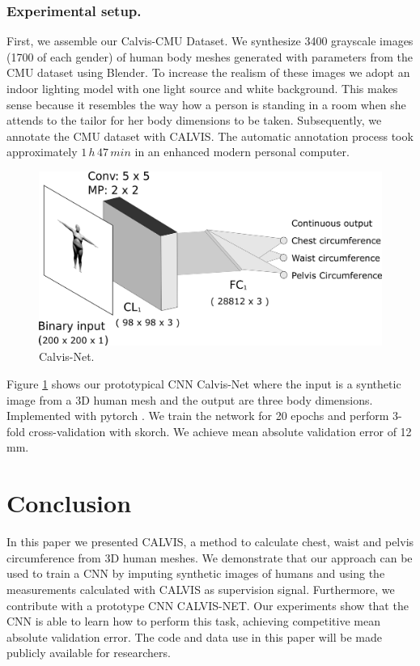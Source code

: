\documentclass[runningheads, orivec]{llncs}
\begin{document}
\subsubsection{Experimental setup.} First, we assemble our Calvis-CMU Dataset. We synthesize 3400 grayscale images (1700 of each gender) of human body meshes generated with parameters from the CMU dataset using Blender. To increase the realism of these images we 
adopt an indoor lighting model with one light source and white background. This makes sense because it resembles the way 
how a person is standing in a room when she attends to the tailor for her 
body dimensions to be taken.
Subsequently, we annotate the CMU dataset with CALVIS. The 
automatic annotation process took approximately $1\,h\, 47\, min$ in an 
enhanced modern personal computer.

\begin{figure}[H]
	\begin{center}
		\includegraphics[width=\linewidth]{Calvis-Net.png}
	\end{center}
	\caption{Calvis-Net.}
	\label{fig:calvis_net}
\end{figure}

Figure \ref{fig:calvis_net} shows our prototypical CNN Calvis-Net where the 
input is a synthetic image from a 3D human mesh and the output are three body 
dimensions. Implemented with pytorch \cite{paszke2017automatic}. We train the network for 20 epochs and perform 3-fold cross-validation  with skorch. We achieve mean absolute validation error of 12 mm.


\section{Conclusion}
In this paper we presented CALVIS, a method to calculate chest, waist and pelvis circumference from 3D human meshes. 
We demonstrate that our approach can be used to train a CNN by imputing synthetic images of humans and using the measurements calculated with CALVIS as supervision signal.
Furthermore, we contribute with a prototype CNN CALVIS-NET. Our experiments show that the CNN is able to learn how to perform this task, achieving competitive mean absolute validation error.
The code 
and data use 
in this paper will be made publicly available for researchers.
%
%
%


%
\end{document}
